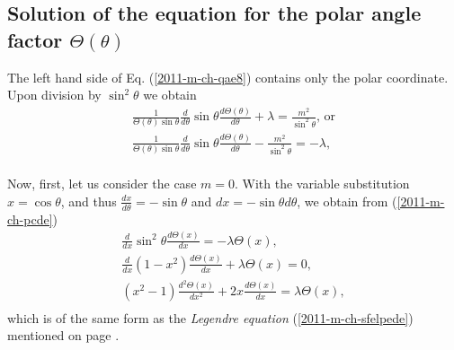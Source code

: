 \subsection{Solution of the equation  for the  polar angle factor $\Theta (\theta )$}

The left hand side of
Eq. (\ref{2011-m-ch-qae8}) contains only the polar coordinate.
Upon division by $\sin ^2 \theta$ we obtain
\begin{equation}
\begin{array}{l}
\frac{1}{\Theta(\theta)\sin \theta}
\frac{   d   }{   d    \theta }
\sin \theta \frac{   d    \Theta(\theta)}{   d    \theta }
+  \lambda
= \frac{m^2}{\sin^2\theta}\textrm{, or}\\
\frac{1}{\Theta(\theta)\sin \theta}
\frac{   d   }{   d    \theta }
\sin \theta \frac{   d    \Theta(\theta)}{   d    \theta }   -\frac{m^2}{\sin^2\theta }
= -  \lambda    ,\\
\end{array}
\label{2011-m-ch-pcde}
\end{equation}

Now, first, let us consider the case $m=0$.
With the variable substitution
$x = \cos \theta$, and thus
$\frac{dx}{d\theta}= -\sin \theta$ and  $dx= -\sin \theta d\theta$, we obtain from (\ref{2011-m-ch-pcde})
\begin{equation}
\begin{array}{l}
\frac{   d   }{   d    x }
\sin^2 \theta \frac{   d    \Theta(x)}{   d    x }
= -  \lambda  \Theta(x)   ,\\
\frac{   d   }{   d    x }
(1-x^2) \frac{   d    \Theta(x)}{   d    x } +  \lambda  \Theta(x)
=  0 ,\\
\left(x^2-1 \right)\frac{   d   ^2 \Theta(x)}{   d    x^2 } + 2 x \frac{   d    \Theta(x)}{   d    x } =  \lambda  \Theta(x)
,\\
\end{array}
\label{2011-m-ch-pcde1}
\end{equation}
which is of the same form as the {\em Legendre equation}
(\ref{2011-m-ch-sfelpede})
mentioned on page \pageref{2011-m-ch-sfelpede}.

